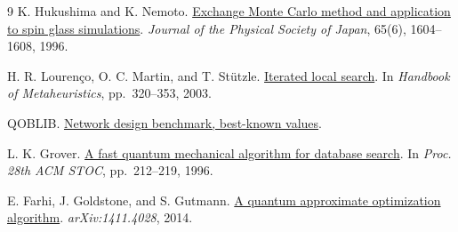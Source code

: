 \documentclass[a4paper]{article}
\begin{document}
\begin{thebibliography}{9}
K. Hukushima and K. Nemoto.
\href{https://doi.org/10.1143/JPSJ.65.1604}{Exchange Monte Carlo method and application to spin glass simulations}.
\emph{Journal of the Physical Society of Japan}, 65(6), 1604--1608, 1996.

H. R. Lourenço, O. C. Martin, and T. Stützle.
\href{https://arxiv.org/abs/math/0102188}{Iterated local search}.
In \emph{Handbook of Metaheuristics}, pp.~320--353, 2003.

QOBLIB.
\href{https://github.com/ZIB-AOPT/QOBLIB/blob/main/08-network/solutions/README.md}{Network design benchmark, best-known values}.

L. K. Grover.
\href{https://arxiv.org/abs/quant-ph/9605043}{A fast quantum mechanical algorithm for database search}.
In \emph{Proc. 28th ACM STOC}, pp.~212--219, 1996.

E. Farhi, J. Goldstone, and S. Gutmann.
\href{https://arxiv.org/abs/1411.4028}{A quantum approximate optimization algorithm}.
\emph{arXiv:1411.4028}, 2014.
\end{thebibliography}
\end{document}
